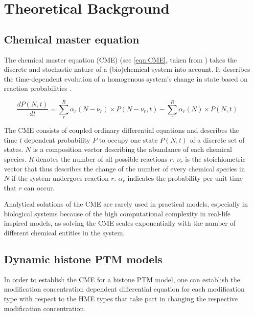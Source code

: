 \chapter{Theoretical Background}
\label{cha:theoreticalBackground}

    \section{Chemical master equation}
        \label{subsec:CME}
        The chemical master equation (CME) (see \ref{eqn:CME}, taken from \cite{johnson2021quantifying}) takes the discrete and stochastic nature of a (bio)chemical system into account. It describes the time-dependent evolution of a homogenous system's change in state based on reaction probabilities \cite{Ge2013, johnson2021quantifying}.

        \begin{equation}
            \frac{dP(N,t)}{dt} = \sum^{R}_{r}{\alpha_r (N -\nu_r) \times P(N-\nu_r, t)} - \sum^{R}_{r}{\alpha_r(N) \times P(N,t)}
            \label{eqn:CME}
        \end{equation}

        The CME consists of coupled ordinary differential equations and describes the time $t$ dependent probability $P$ to occupy one state $P(N,t)$ of a discrete set of states. $N$ is a composition vector describing the abundance of each chemical species. $R$ denotes the number of all possible reactions $r$. $\nu_r$ is the stoichiometric vector that thus describes the change of the number of every chemical species in $N$ if the system undergoes reaction $r$. $\alpha_r$ indicates the probability per unit time that $r$ can occur.

        Analytical solutions of the CME are rarely used in practical models, especially in biological systems \cite{johnson2021quantifying} because of the high computational complexity in real-life inspired models, as solving the CME scales exponentially with the number of different chemical entities in the system.
    \section{Dynamic histone PTM models}

        In order to establish the CME for a histone PTM model, one can establish the modification concentration dependent differential equation \cite{lemons1908paper} for each modification type with respect to the HME types that take part in changing the respective modification concentration.

